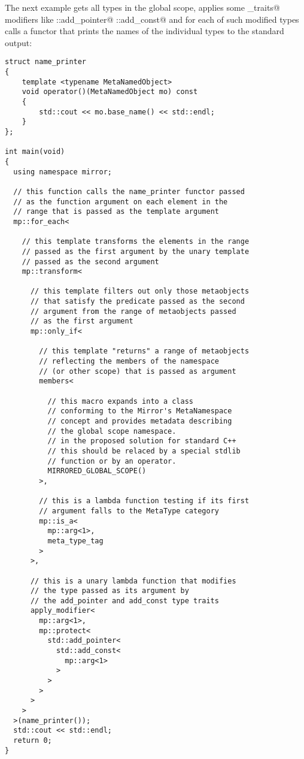 The next example gets all types in the global scope,
applies some \verb@type_traits@ modifiers like \verb@std::add_pointer@
\verb@std::add_const@ and for each of such modified types calls a functor
that prints the names of the individual types to the standard output:

\begin{verbatim}
struct name_printer
{
    template <typename MetaNamedObject>
    void operator()(MetaNamedObject mo) const
    {
        std::cout << mo.base_name() << std::endl;
    }
};

int main(void)
{
  using namespace mirror;

  // this function calls the name_printer functor passed
  // as the function argument on each element in the 
  // range that is passed as the template argument
  mp::for_each<

    // this template transforms the elements in the range
    // passed as the first argument by the unary template
    // passed as the second argument
    mp::transform<

      // this template filters out only those metaobjects
      // that satisfy the predicate passed as the second
      // argument from the range of metaobjects passed
      // as the first argument
      mp::only_if<

        // this template "returns" a range of metaobjects
        // reflecting the members of the namespace
        // (or other scope) that is passed as argument
        members<

          // this macro expands into a class
          // conforming to the Mirror's MetaNamespace
          // concept and provides metadata describing
          // the global scope namespace.
          // in the proposed solution for standard C++
          // this should be relaced by a special stdlib
          // function or by an operator.
          MIRRORED_GLOBAL_SCOPE()
        >,

        // this is a lambda function testing if its first
        // argument falls to the MetaType category
        mp::is_a<
          mp::arg<1>,
          meta_type_tag
        >
      >,

      // this is a unary lambda function that modifies
      // the type passed as its argument by
      // the add_pointer and add_const type traits
      apply_modifier<
        mp::arg<1>,
        mp::protect<
          std::add_pointer<
            std::add_const<
              mp::arg<1>
            >
          >
        >
      >
    >
  >(name_printer());
  std::cout << std::endl;
  return 0;
}

\end{verbatim}


